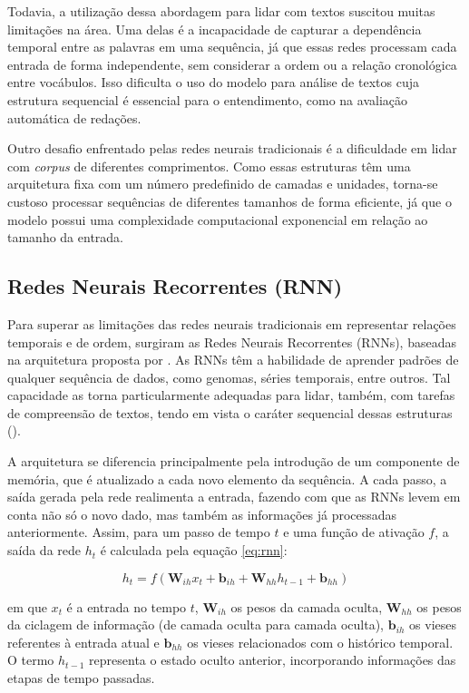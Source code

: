 Todavia, a utilização dessa abordagem para lidar com textos suscitou muitas limitações na área. Uma delas é a incapacidade de capturar a dependência temporal entre as palavras em uma sequência, já que essas redes processam cada entrada de forma independente, sem considerar a ordem ou a relação cronológica entre vocábulos. Isso dificulta o uso do modelo para análise de textos cuja estrutura sequencial é essencial para o entendimento, como na avaliação automática de redações.

Outro desafio enfrentado pelas redes neurais tradicionais é a dificuldade em lidar com \textit{corpus} de diferentes comprimentos. Como essas estruturas têm uma arquitetura fixa com um número predefinido de camadas e unidades, torna-se custoso processar sequências de diferentes tamanhos de forma eficiente, já que o modelo possui uma complexidade computacional exponencial em relação ao tamanho da entrada.

\subsection{Redes Neurais Recorrentes (RNN)}

Para superar as limitações das redes neurais tradicionais em representar relações temporais e de ordem, surgiram as Redes Neurais Recorrentes (RNNs), baseadas na arquitetura proposta por \citet{rumelhart-1986-learning}. As RNNs têm a habilidade de aprender padrões de qualquer sequência de dados, como genomas, séries temporais, entre outros. Tal capacidade as torna particularmente adequadas para lidar, também, com tarefas de compreensão de textos, tendo em vista o caráter sequencial dessas estruturas (\cite{zhang2023dive}).

A arquitetura se diferencia principalmente pela introdução de um componente de memória, que é atualizado a cada novo elemento da sequência. A cada passo, a saída gerada pela rede realimenta a entrada, fazendo com que as RNNs levem em conta não só o novo dado, mas também as informações já processadas anteriormente. Assim, para um passo de tempo $t$ e uma função de ativação $f$, a saída da rede $h_t$ é calculada pela equação \ref{eq:rnn}:

\begin{equation}
    \label{eq:rnn}
    h_t = f(\boldsymbol{W}_{ih} x_t + \boldsymbol{b}_{ih} + \boldsymbol{W}_{hh} h_{t-1} + \boldsymbol{b}_{hh})
\end{equation}

em que $x_t$ é a entrada no tempo $t$, $\boldsymbol{W}_{ih}$ os pesos da camada oculta, $\boldsymbol{W}_{hh}$ os pesos da ciclagem de informação (de camada oculta para camada oculta), $\boldsymbol{b}_{ih}$ os vieses referentes à entrada atual e $\boldsymbol{b}_{hh}$ os vieses relacionados com o histórico temporal. O termo $h_{t-1}$ representa o estado oculto anterior, incorporando informações das etapas de tempo passadas.

